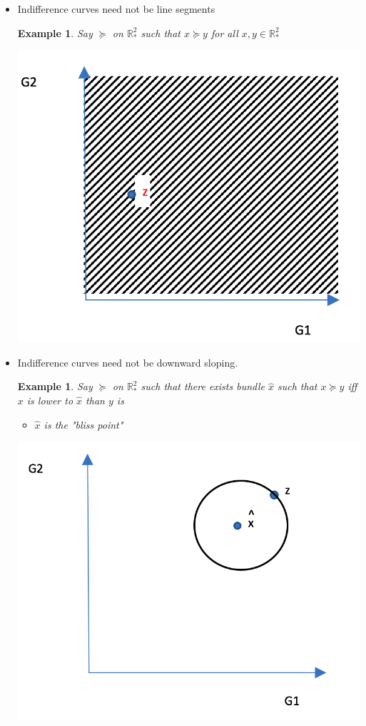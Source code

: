 \documentclass[twoside]{article}
\newtheorem{ex}[theorem]{Example}
\begin{document}
\begin{itemize}
\item Indifference curves need not be line segments
\begin{ex} Say \(\succeq\) on \(\mathbb{R}^2_*\) such that \(x \succeq y\) for all \(x, y \in \mathbb{R}^2_*\)
\begin{center}
\includegraphics[scale=0.4]{4}
\end{center}
\end{ex}
\item Indifference curves need not be downward sloping.
\begin{ex}
Say \(\succeq\) on \(\mathbb{R}^2_*\) such that there exists bundle \(\hat{x}\) such that \(x \succeq y\) iff \(x\) is lower to \(\hat{x}\) than \(y\) is \begin{itemize}
\item \(\hat{x}\) is the "bliss point"
\end{itemize}
\begin{center}
\includegraphics[scale=0.4]{5}

\end{center}
\end{ex}
\end{itemize}
\end{document}
